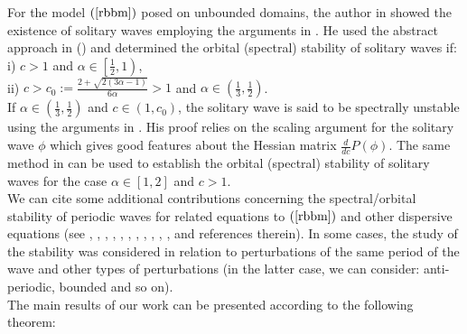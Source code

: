 \documentclass[12pt,reqno]{amsart}
\newcommand{\2}{L^2_{per}(0, T)}
\numberwithin{equation}{section}
\numberwithin{figure}{section}
\begin{document}
\indent For the model $(\ref{rbbm})$ posed on unbounded domains, the author in \cite{angulo1} showed the existence of solitary waves employing the arguments in \cite{FL}. He used the abstract approach in \cite{grillakis1} (\cite{lin}) and determined the orbital (spectral) stability of solitary waves if:\\
i) $c>1$ and $\alpha\in \left[\frac{1}{2},1\right)$,\\
ii) $c>c_0:=\frac{2+\sqrt{2(3\alpha-1)}}{6\alpha}>1$ and $\alpha\in \left(\frac{1}{3},\frac{1}{2}\right)$.\\
If $\alpha\in\left(\frac{1}{3},\frac{1}{2}\right)$ and $c\in (1,c_0)$, the solitary wave is said to be spectrally unstable using the arguments in \cite{lin}. His proof relies on the scaling argument for the solitary wave $\phi$ which gives  good features about the  Hessian matrix $\frac{d}{dc}P(\phi)$. The same method in \cite{angulo1} can be used to establish the orbital (spectral) stability of solitary waves for the case $\alpha\in[ 1,2]$ and $c>1$. \\
\indent We can cite some additional contributions concerning the spectral/orbital stability of periodic waves for related equations to $(\ref{rbbm})$ and other dispersive equations (see \cite{ANP}, \cite{ACN}, \cite{natali}, \cite{CJ2019}, \cite{DK}, \cite{gallay}, \cite{gavage}, \cite{hakkaev12}, \cite{johnson13}, \cite{NPU1}, \cite{NPL}, and references therein). In some cases, the study of the stability was considered in relation to perturbations of the same period of the wave and other types of perturbations (in the latter case, we can consider: anti-periodic, bounded and so on). \\
\indent  The main results of our work can be presented according to the following theorem:
\end{document}
